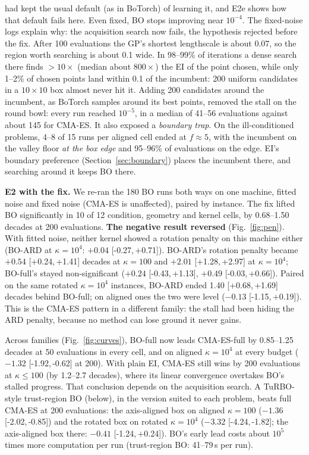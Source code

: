 \documentclass[10pt,a4paper]{article}
\newcommand{\ci}[2]{[#1,\,#2]}      %
\begin{document}
had kept the usual default (as in BoTorch) of learning it, and E2e shows how that default fails here. Even fixed,
BO stops improving near $10^{-4}$. The fixed-noise logs explain why: the acquisition search now fails,
the hypothesis rejected before the fix. After 100 evaluations the GP's shortest lengthscale is about
0.07, so the region worth searching is about 0.1 wide. In 98--99\% of iterations a dense search there
finds $>10\times$ (median about $800\times$) the EI of the point chosen, while only 1--2\% of chosen
points land within 0.1 of the incumbent: 200 uniform candidates in a $10\times10$ box almost never hit it.
Adding 200 candidates around the incumbent, as BoTorch samples around its best points, removed the
stall on the round bowl: every run reached $10^{-5}$, in a median of 41--56 evaluations against about 145
for CMA-ES. It also exposed a \emph{boundary trap}. On the ill-conditioned problems, 4--8 of 15 runs per
aligned cell ended at $f\approx5$, with the incumbent on the valley floor \emph{at the box edge} and
95--96\% of evaluations on the edge. EI's boundary preference (Section~\ref{sec:boundary}) places the
incumbent there, and searching around it keeps BO there.

\textbf{E2 with the fix.} We re-ran the 180 BO runs both ways on one machine, fitted noise and fixed
noise (CMA-ES is unaffected), paired by instance. The fix lifted BO significantly in 10 of 12
condition, geometry and kernel cells, by 0.68--1.50 decades at 200 evaluations. \textbf{The negative
result reversed} (Fig.~\ref{fig:pen}). With fitted noise, neither kernel showed a rotation penalty on
this machine either (BO-ARD at $\kappa=10^4$: $+0.04$ \ci{-0.27}{+0.71}). BO-ARD's rotation penalty became $+0.54$ \ci{+0.24}{+1.41}
decades at $\kappa=100$ and $+2.01$ \ci{+1.28}{+2.97} at $\kappa=10^4$; BO-full's stayed non-significant
($+0.24$ \ci{-0.43}{+1.13}, $+0.49$ \ci{-0.03}{+0.66}). Paired on the same rotated $\kappa=10^4$
instances, BO-ARD ended 1.40 \ci{+0.68}{+1.69} decades behind BO-full; on aligned ones the two were level
($-0.13$ \ci{-1.15}{+0.19}). This is the CMA-ES pattern in a different family: the stall had been hiding
the ARD penalty, because no method can lose ground it never gains.

Across families (Fig.~\ref{fig:curves}), BO-full now leads CMA-ES-full by 0.85--1.25 decades at 50
evaluations in every cell, and on aligned $\kappa=10^4$ at every budget ($-1.32$ \ci{-1.92}{-0.62} at 200).
With plain EI, CMA-ES still wins by 200 evaluations at $\kappa\le100$ (by 1.2--2.7 decades), where its
linear convergence overtakes BO's stalled progress. That conclusion depends on the acquisition search.
A TuRBO-style trust-region BO (below), in the version suited to each problem, beats full CMA-ES at 200
evaluations: the axis-aligned box on aligned $\kappa=100$ ($-1.36$ \ci{-2.02}{-0.85}) and the rotated box on
rotated $\kappa=10^4$ ($-3.32$ \ci{-4.24}{-1.82}; the axis-aligned box there: $-0.41$ \ci{-1.24}{+0.24}). BO's early lead costs about
$10^5$ times more computation per run (trust-region BO: 41--79\,s per run).
\end{document}
